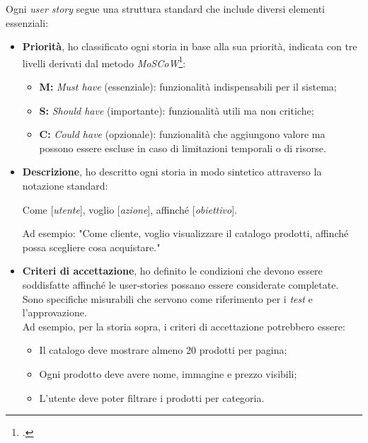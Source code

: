 \noindent Ogni \textit{user story} segue una struttura standard che include diversi elementi essenziali:\\
\begin{itemize}

    \item \textbf{Priorità}, ho classificato ogni storia in base alla sua priorità, indicata con tre livelli derivati dal metodo \textit{MoSCoW}\footcite{site:moscow-method}:
    \begin{itemize}
        \item \textbf{M:} \textit{Must have} (essenziale): funzionalità indispensabili per il sistema;
        \item \textbf{S:} \textit{Should have} (importante): funzionalità utili ma non critiche;
        \item \textbf{C:} \textit{Could have} (opzionale): funzionalità che aggiungono valore ma possono essere escluse in caso di limitazioni temporali o di risorse.   
    \end{itemize}

    \item \textbf{Descrizione}, ho descritto ogni storia in modo sintetico attraverso la notazione standard:

    \begin{center}
        Come [\textit{utente}], voglio [\textit{azione}], affinché [\textit{obiettivo}].
    \end{center}
    Ad esempio: "Come cliente, voglio visualizzare il catalogo prodotti, affinché possa scegliere cosa acquistare."\\

    \item \textbf{Criteri di accettazione}, ho definito le condizioni che devono essere soddisfatte affinché le \gls{user-stories} possano essere considerate completate.\\
    Sono specifiche misurabili che servono come riferimento per i \textit{test} e l’approvazione. \\

    \noindent Ad esempio, per la storia sopra, i criteri di accettazione potrebbero essere:

    \begin{itemize}
        \item Il catalogo deve mostrare almeno 20 prodotti per pagina;
        \item Ogni prodotto deve avere nome, immagine e prezzo visibili;
        \item L’utente deve poter filtrare i prodotti per categoria.
    \end{itemize}

\end{itemize}

